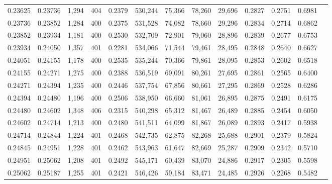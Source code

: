\begin{tabular}{rrrrrrrrrrrrr}
0.23625 & 0.23736 &  1,294 & 404 &                                     0.2379 & 530,244 &  75,366 &  78,260 &  29,696 & 0.2827 & 0.2751 & 0.6981 \\
0.23736 & 0.23852 &  1,284 & 400 &                                     0.2375 & 531,528 &  74,082 &  78,660 &  29,296 & 0.2834 & 0.2714 & 0.6862 \\
0.23852 & 0.23934 &  1,181 & 400 &                                     0.2530 & 532,709 &  72,901 &  79,060 &  28,896 & 0.2839 & 0.2677 & 0.6753 \\
0.23934 & 0.24050 &  1,357 & 401 &                                     0.2281 & 534,066 &  71,544 &  79,461 &  28,495 & 0.2848 & 0.2640 & 0.6627 \\
0.24051 & 0.24155 &  1,178 & 400 &                                     0.2535 & 535,244 &  70,366 &  79,861 &  28,095 & 0.2853 & 0.2602 & 0.6518 \\
0.24155 & 0.24271 &  1,275 & 400 &                                     0.2388 & 536,519 &  69,091 &  80,261 &  27,695 & 0.2861 & 0.2565 & 0.6400 \\
0.24271 & 0.24394 &  1,235 & 400 &                                     0.2446 & 537,754 &  67,856 &  80,661 &  27,295 & 0.2869 & 0.2528 & 0.6286 \\
0.24394 & 0.24480 &  1,196 & 400 &                                     0.2506 & 538,950 &  66,660 &  81,061 &  26,895 & 0.2875 & 0.2491 & 0.6175 \\
0.24480 & 0.24602 &  1,348 & 406 &                                     0.2315 & 540,298 &  65,312 &  81,467 &  26,489 & 0.2885 & 0.2454 & 0.6050 \\
0.24602 & 0.24714 &  1,213 & 400 &                                     0.2480 & 541,511 &  64,099 &  81,867 &  26,089 & 0.2893 & 0.2417 & 0.5938 \\
0.24714 & 0.24844 &  1,224 & 401 &                                     0.2468 & 542,735 &  62,875 &  82,268 &  25,688 & 0.2901 & 0.2379 & 0.5824 \\
0.24845 & 0.24951 &  1,228 & 401 &                                     0.2462 & 543,963 &  61,647 &  82,669 &  25,287 & 0.2909 & 0.2342 & 0.5710 \\
0.24951 & 0.25062 &  1,208 & 401 &                                     0.2492 & 545,171 &  60,439 &  83,070 &  24,886 & 0.2917 & 0.2305 & 0.5598 \\
0.25062 & 0.25187 &  1,255 & 401 &                                     0.2421 & 546,426 &  59,184 &  83,471 &  24,485 & 0.2926 & 0.2268 & 0.5482 \\

\end{tabular}
